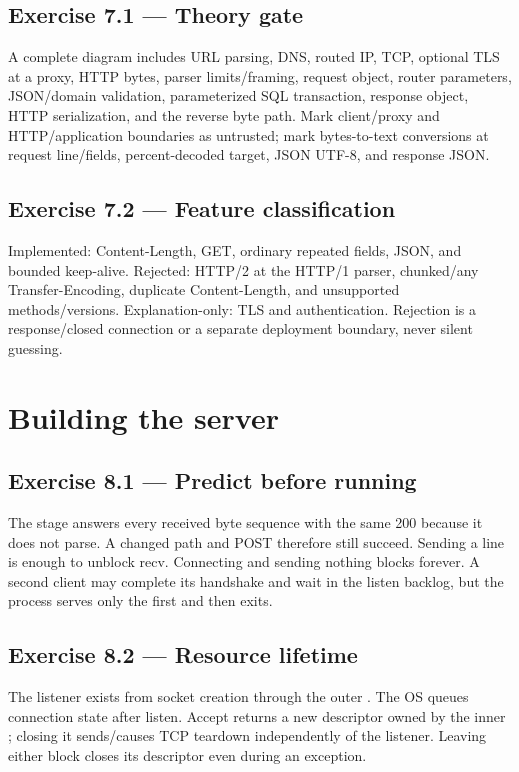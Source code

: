 \subsection*{Exercise 7.1 --- Theory gate}

A complete diagram includes URL parsing, DNS, routed IP, TCP, optional TLS at a
proxy, HTTP bytes, parser limits/framing, request object, router parameters,
JSON/domain validation, parameterized SQL transaction, response object, HTTP
serialization, and the reverse byte path. Mark client/proxy and HTTP/application
boundaries as untrusted; mark bytes-to-text conversions at request line/fields,
percent-decoded target, JSON UTF-8, and response JSON.

\subsection*{Exercise 7.2 --- Feature classification}

Implemented: Content-Length, GET, ordinary repeated fields, JSON, and bounded
keep-alive. Rejected: HTTP/2 at the HTTP/1 parser, chunked/any Transfer-Encoding,
duplicate Content-Length, and unsupported methods/versions. Explanation-only:
TLS and authentication. Rejection is a response/closed connection or a separate
deployment boundary, never silent guessing.

\section{Building the server}

\subsection*{Exercise 8.1 --- Predict before running}

The stage answers every received byte sequence with the same 200 because it does
not parse. A changed path and POST therefore still succeed. Sending a line is
enough to unblock recv. Connecting and sending nothing blocks forever. A second
client may complete its handshake and wait in the listen backlog, but the process
serves only the first and then exits.

\subsection*{Exercise 8.2 --- Resource lifetime}

The listener exists from socket creation through the outer . The OS
queues connection state after listen. Accept returns a new descriptor owned by
the inner ; closing it sends/causes TCP teardown independently of the
listener. Leaving either block closes its descriptor even during an exception.


